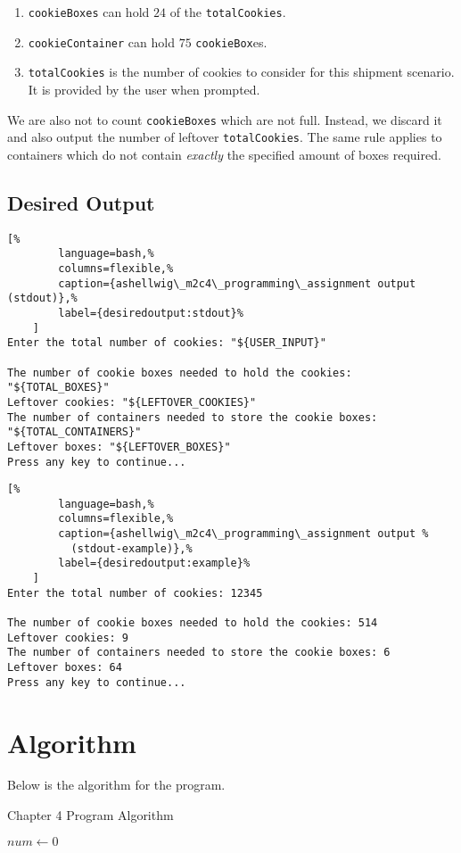 \documentclass[a4paper, 11pt]{article}
\begin{document}
      \begin{enumerate}
        \item \texttt{cookieBoxes} can hold $24$ of the \texttt{totalCookies}.
        \item \texttt{cookieContainer} can hold $75$ \texttt{cookieBox}es.
        \item \texttt{totalCookies} is the number of cookies to consider for
          this shipment scenario. It is provided by the user when prompted.
      \end{enumerate}

      We are also not to count \texttt{cookieBoxes} which are not full. Instead,
        we discard it and also output the number of leftover
        \texttt{totalCookies}. The same rule applies to containers which do not
        contain \textit{exactly} the specified amount of boxes required.

    \subsection{Desired Output}
      \begin{lstlisting}[%
        language=bash,%
        columns=flexible,%
        caption={ashellwig\_m2c4\_programming\_assignment output (stdout)},%
        label={desiredoutput:stdout}%
    ]
Enter the total number of cookies: "${USER_INPUT}"

The number of cookie boxes needed to hold the cookies: "${TOTAL_BOXES}"
Leftover cookies: "${LEFTOVER_COOKIES}"
The number of containers needed to store the cookie boxes: "${TOTAL_CONTAINERS}"
Leftover boxes: "${LEFTOVER_BOXES}"
Press any key to continue...
      \end{lstlisting}
      \begin{lstlisting}[%
        language=bash,%
        columns=flexible,%
        caption={ashellwig\_m2c4\_programming\_assignment output %
          (stdout-example)},%
        label={desiredoutput:example}%
    ]
Enter the total number of cookies: 12345

The number of cookie boxes needed to hold the cookies: 514
Leftover cookies: 9
The number of containers needed to store the cookie boxes: 6
Leftover boxes: 64
Press any key to continue...
      \end{lstlisting}


  \newpage
  \section{Algorithm}
    Below is the algorithm for the program.
    \begin{algorithm}[h]
      \caption{Chapter 4 Program Algorithm}
      \vspace{12pt}
      \begin{algorithmic}[1]
        \State
          \State $num\gets 0$
        \EndFunction
      \end{algorithmic}
      \label{alg:c3program}
    \end{algorithm}
\end{document}
